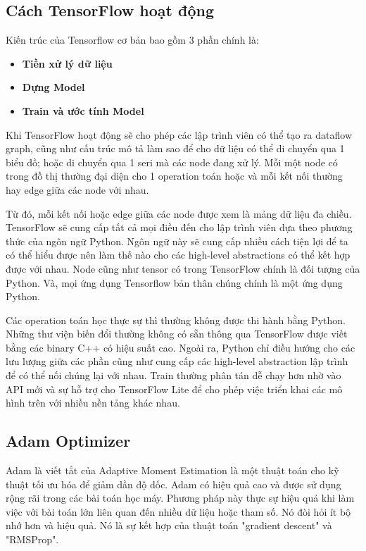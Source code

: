 \subsection{Cách TensorFlow hoạt động}
Kiến trúc của Tensorflow cơ bản bao gồm 3 phần chính là: 
\begin{itemize}
\item \textbf{Tiền xử lý dữ liệu}
\item \textbf{Dựng Model}
\item  \textbf{Train và ước tính Model}
\end{itemize}

Khi TensorFlow hoạt động sẽ cho phép các lập trình viên có thể tạo ra dataflow graph, cũng như cấu trúc mô tả làm sao để cho dữ liệu có thể di chuyển 
qua 1 biểu đồ; hoặc di chuyển qua 1 seri mà các node đang xử lý. Mỗi một node có trong đồ thị thường đại diện cho 1 operation toán hoặc và mỗi kết nối 
thường hay edge giữa các node với nhau.

Từ đó, mỗi kết nối hoặc edge giữa các node được xem là mảng dữ liệu đa chiều. TensorFlow sẽ cung cấp tất cả mọi điều đến cho lập trình viên dựa theo 
phương thức của ngôn ngữ Python. Ngôn ngữ này sẽ cung cấp nhiều cách tiện lợi để ta có thể hiểu được nên làm thế nào cho các high-level abstractions 
có thể kết hợp được với nhau. Node cũng như tensor có trong TensorFlow chính là đối tượng của Python. Và, mọi ứng dụng Tensorflow bản thân chúng chính 
là một ứng dụng Python. 

Các operation toán học thực sự thì thường không được thi hành bằng Python. Những thư viện biến đổi thường không có sẵn thông qua TensorFlow được viết 
bằng các binary C++ có hiệu suất cao.
Ngoài ra, Python chỉ điều hướng cho các lưu lượng giữa các phần cũng như cung cấp các high-level abstraction lập trình để có thể nối chúng lại với nhau. 
Train thường phân tán dễ chạy hơn nhờ vào API mới và sự hỗ trợ cho TensorFlow Lite để cho phép việc triển khai các mô hình trên với nhiều nền tảng khác nhau. 

\subsection{Adam Optimizer}
Adam là viết tắt của Adaptive Moment Estimation là một thuật toán cho kỹ thuật tối ưu hóa để giảm dần độ dốc. Adam có hiệu quả cao và được sử dụng rộng rãi 
trong các bài toán học máy. Phương pháp này thực sự hiệu quả khi làm việc với bài toán lớn liên quan đến nhiều dữ liệu hoặc tham số. Nó đòi hỏi ít bộ nhớ hơn và hiệu quả. 
Nó là sự kết hợp của thuật toán "gradient descent" và "RMSProp".

